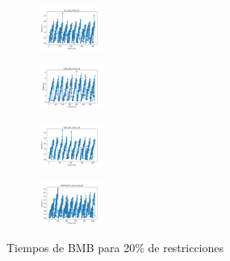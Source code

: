 \begin{figure}[H]
\begin{subfigure}
        \centering
        \includegraphics[width=0.234\textwidth]{img/bmb/iris_set_const_20_3773969821_time.png}
    \end{subfigure}
    \hfill
    \begin{subfigure}
        \centering
        \includegraphics[width=0.234\textwidth]{img/bmb/ecoli_set_const_20_3773969821_time.png}
    \end{subfigure}
    \hfill
    \begin{subfigure}
        \centering
        \includegraphics[width=0.234\textwidth]{img/bmb/rand_set_const_20_3773969821_time.png}
    \end{subfigure}
    \hfill
    \begin{subfigure}
        \centering
        \includegraphics[width=0.234\textwidth]{img/bmb/newthyroid_set_const_20_3773969821_time.png}
    \end{subfigure}
    \caption{Tiempos de BMB para 20\% de restricciones}
\end{figure}

\vspace*{\fill}
\newpage
\vspace*{\fill}

